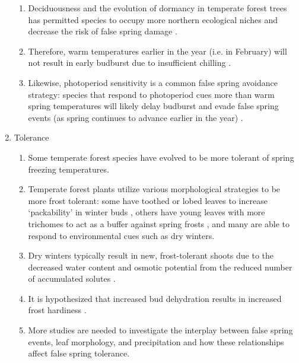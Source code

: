 \documentclass{article}\usepackage[]{graphicx}\usepackage[]{color}
\begin{document}
\begin{enumerate}
\begin {enumerate}
\item Deciduousness and the evolution of dormancy in temperate forest trees has permitted species to occupy more northern ecological niches and decrease the risk of false spring damage \citep{Samish1954}.
\item Therefore, warm temperatures earlier in the year (i.e. in February) will not result in early budburst due to insufficient chilling \citep{Basler2012}.
\item Likewise, photoperiod sensitivity is a common false spring avoidance strategy: species that respond to photoperiod cues more than warm spring temperatures will likely delay budburst and evade false spring events (as spring continues to advance earlier in the year) \citep{Basler2014}.
\end {enumerate}
\item Tolerance
\begin{enumerate}
\item Some temperate forest species have evolved to be more tolerant of spring freezing temperatures.
\item Temperate forest plants utilize various morphological strategies to be more frost tolerant: some have toothed or lobed leaves to increase `packability' in winter buds \citep{Edwards2017}, others have young leaves with more trichomes to act as a buffer against spring frosts \citep{Agrawal2004}, and many are able to respond to environmental cues such as dry winters. 
\item Dry winters typically result in new, frost-tolerant shoots due to the decreased water content and osmotic potential from the reduced number of accumulated solutes \citep{Morin2007, Hofmann2015}.
\item It is hypothesized that increased bud dehydration results in increased frost hardiness \citep{Beck2007, Nielsen2009, Poirier2010, Kathke2011, Hofmann2015}.
\item More studies are needed to investigate the interplay between false spring events, leaf morphology, and precipitation and how these relationships affect false spring tolerance.
\end{enumerate}
\end{enumerate}



\end{document}
